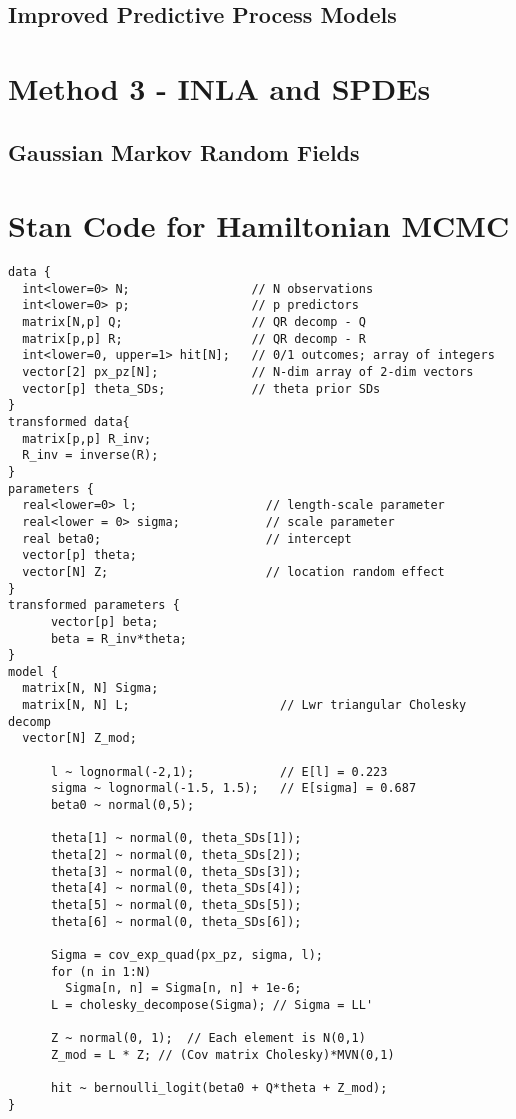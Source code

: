 \documentclass{article}
\begin{document}
\subsection{Improved Predictive Process Models}




\section{Method 3 - INLA and SPDEs} %

\subsection{Gaussian Markov Random Fields}

\appendix
\section{Stan Code for Hamiltonian MCMC} %
\begin{verbatim}
data {                             
  int<lower=0> N;                 // N observations
  int<lower=0> p;                 // p predictors
  matrix[N,p] Q;                  // QR decomp - Q
  matrix[p,p] R;                  // QR decomp - R
  int<lower=0, upper=1> hit[N];   // 0/1 outcomes; array of integers
  vector[2] px_pz[N];             // N-dim array of 2-dim vectors
  vector[p] theta_SDs;            // theta prior SDs
}
transformed data{
  matrix[p,p] R_inv;
  R_inv = inverse(R);
}
parameters {                
  real<lower=0> l;                  // length-scale parameter
  real<lower = 0> sigma;            // scale parameter
  real beta0;                       // intercept 
  vector[p] theta;
  vector[N] Z;                      // location random effect
}
transformed parameters {
      vector[p] beta;
      beta = R_inv*theta;
}
model {  
  matrix[N, N] Sigma;
  matrix[N, N] L;                     // Lwr triangular Cholesky decomp
  vector[N] Z_mod;
      
      l ~ lognormal(-2,1);            // E[l] = 0.223
      sigma ~ lognormal(-1.5, 1.5);   // E[sigma] = 0.687
      beta0 ~ normal(0,5);
      
      theta[1] ~ normal(0, theta_SDs[1]);
      theta[2] ~ normal(0, theta_SDs[2]);
      theta[3] ~ normal(0, theta_SDs[3]);
      theta[4] ~ normal(0, theta_SDs[4]);
      theta[5] ~ normal(0, theta_SDs[5]);
      theta[6] ~ normal(0, theta_SDs[6]);
      
      Sigma = cov_exp_quad(px_pz, sigma, l); 
      for (n in 1:N)
        Sigma[n, n] = Sigma[n, n] + 1e-6;
      L = cholesky_decompose(Sigma); // Sigma = LL' 
      
      Z ~ normal(0, 1);  // Each element is N(0,1)
      Z_mod = L * Z; // (Cov matrix Cholesky)*MVN(0,1)
      
      hit ~ bernoulli_logit(beta0 + Q*theta + Z_mod);
}
\end{verbatim}
\end{document}
